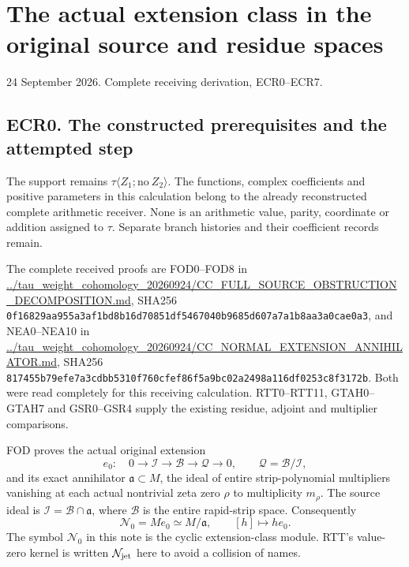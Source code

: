 \section{The actual extension class in the original source and residue
spaces}\label{the-actual-extension-class-in-the-original-source-and-residue-spaces}

24 September 2026. Complete receiving derivation, ECR0--ECR7.

\subsection{ECR0. The constructed prerequisites and the attempted
step}\label{ecr0.-the-constructed-prerequisites-and-the-attempted-step}

The support remains \(\tau\langle Z_1;\mathrm{no}\ Z_2\rangle\). The
functions, complex coefficients and positive parameters in this
calculation belong to the already reconstructed complete arithmetic
receiver. None is an arithmetic value, parity, coordinate or addition
assigned to \(\tau\). Separate branch histories and their coefficient
records remain.

The complete received proofs are FOD0--FOD8 in
\href{https://github.com/KokunoYumeto/zeta-function-research-reader/blob/36a82ecca98addb8a98b48204e349737856c7223/workbenches/splitzero-tandem/continuations/20260924-cohomology-weight-and-character-lifts/gct-weight-control/proofs/CC_FULL_SOURCE_OBSTRUCTION_DECOMPOSITION.md}{../tau\_weight\_cohomology\_20260924/CC\_FULL\_SOURCE\_OBSTRUCTION\_DECOMPOSITION.md},
SHA256
\texttt{0f16829aa955a3af1bd8b16d70851df5467040b9685d607a7a1b8aa3a0cae0a3},
and NEA0--NEA10 in
\href{https://github.com/KokunoYumeto/zeta-function-research-reader/blob/36a82ecca98addb8a98b48204e349737856c7223/workbenches/splitzero-tandem/continuations/20260924-cohomology-weight-and-character-lifts/gct-weight-control/proofs/CC_NORMAL_EXTENSION_ANNIHILATOR.md}{../tau\_weight\_cohomology\_20260924/CC\_NORMAL\_EXTENSION\_ANNIHILATOR.md},
SHA256
\texttt{817455b79efe7a3cdbb5310f760cfef86f5a9bc02a2498a116df0253c8f3172b}.
Both were read completely for this receiving calculation. RTT0--RTT11,
GTAH0--GTAH7 and GSR0--GSR4 supply the existing residue, adjoint and
multiplier comparisons.

FOD proves the actual original extension \[
e_0:\quad0\longrightarrow\mathcal I\longrightarrow\mathcal B
\longrightarrow\mathcal Q\longrightarrow0,
\qquad \mathcal Q=\mathcal B/\mathcal I,
\tag{ECR0.1}
\] and its exact annihilator \(\mathfrak a\subset M\), the ideal of
entire strip-polynomial multipliers vanishing at each actual nontrivial
zeta zero \(\rho\) to multiplicity \(m_\rho\). The source ideal is
\(\mathcal I=\mathcal B\cap\mathfrak a\), where \(\mathcal B\) is the
entire rapid-strip space. Consequently \[
\mathscr N_0=M e_0\simeq M/\mathfrak a,\qquad [h]\longmapsto h e_0.
\tag{ECR0.2}
\] The symbol \(\mathscr N_0\) in this note is the cyclic
extension-class module. RTT's value-zero kernel is written
\(\mathcal N_{\rm jet}\) here to avoid a collision of names.

